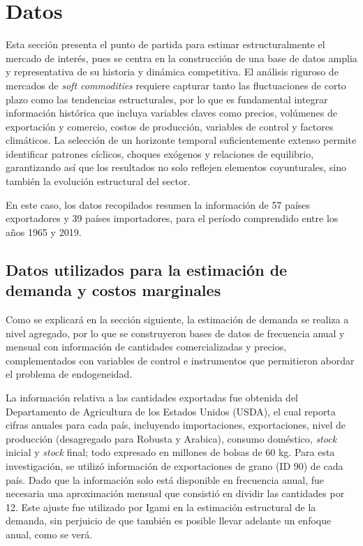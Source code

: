 \chapter{Datos}
\label{chap:datos}

Esta sección presenta el punto de partida para estimar estructuralmente el mercado de interés, pues se centra en la construcción de una base de datos amplia y representativa de su historia y dinámica competitiva. El análisis riguroso de mercados de \textit{soft commodities} requiere capturar tanto las fluctuaciones de corto plazo como las tendencias estructurales, por lo que es fundamental integrar información histórica que incluya variables claves como precios, volúmenes de exportación y comercio, costos de producción, variables de control y factores climáticos. La selección de un horizonte temporal suficientemente extenso permite identificar patrones cíclicos, choques exógenos y relaciones de equilibrio, garantizando así que los resultados no solo reflejen elementos coyunturales, sino también la evolución estructural del sector.

En este caso, los datos recopilados resumen la información de 57 países exportadores y 39 países importadores, para el período comprendido entre los años 1965 y 2019.

\section{Datos utilizados para la estimación de demanda y costos marginales}

Como se explicará en la sección siguiente, la estimación de demanda se realiza a nivel agregado, por lo que se construyeron bases de datos de frecuencia anual y mensual con información de cantidades comercializadas y precios, complementados con variables de control e instrumentos que permitieron abordar el problema de endogeneidad.

La información relativa a las cantidades exportadas fue obtenida del Departamento de Agricultura de los Estados Unidos (USDA), el cual reporta cifras anuales para cada país, incluyendo importaciones, exportaciones, nivel de producción (desagregado para Robusta y Arabica), consumo doméstico, \textit{stock} inicial y \textit{stock} final; todo expresado en millones de bolsas de 60 kg. Para esta investigación, se utilizó información de exportaciones de grano (ID 90) de cada país. Dado que la información solo está disponible en frecuencia anual, fue necesaria una aproximación mensual que consistió en dividir las cantidades por 12. Este ajuste fue utilizado por Igami \citeyearpar{igami2015market} en la estimación estructural de la demanda, sin perjuicio de que también es posible llevar adelante un enfoque anual, como se verá.


